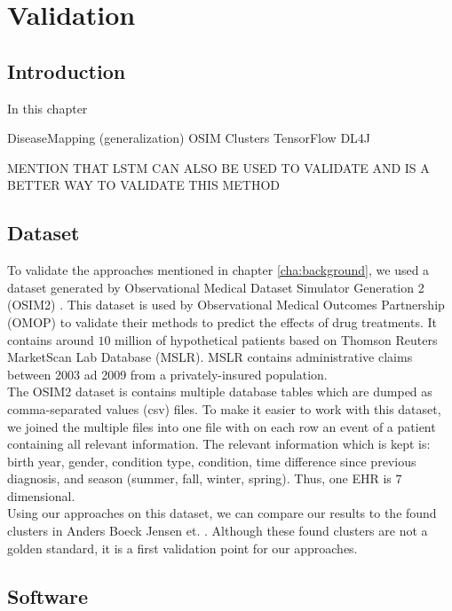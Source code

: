 \graphicspath{ {Implementation/Images/} }


\chapter{Validation}
\label{cha:implementation}

\section{Introduction}
In this chapter 

DiseaseMapping (generalization)
OSIM
Clusters
TensorFlow
DL4J

MENTION THAT LSTM CAN ALSO BE USED TO VALIDATE AND IS A BETTER WAY TO VALIDATE THIS METHOD


\section{Dataset}

To validate the approaches mentioned in chapter \ref{cha:background}, we used a dataset generated by Observational Medical Dataset Simulator Generation 2 (OSIM2) \cite{OSIM:online}. This dataset is used by Observational Medical Outcomes Partnership (OMOP) to validate their methods to predict the effects of drug treatments. It contains around $10$ million of hypothetical patients based on Thomson Reuters MarketScan Lab Database (MSLR). MSLR contains administrative claims between 2003 ad 2009 from a privately-insured population. \\

The OSIM2 dataset is contains multiple database tables which are dumped as comma-separated values (csv) files. To make it easier to work with this dataset, we joined the multiple files into one file with on each row an event of a patient containing all relevant information. The relevant information which is kept is: birth year, gender, condition type, condition, time difference since previous diagnosis, and season (summer, fall, winter, spring). Thus, one EHR is $7$ dimensional. \\	

Using our approaches on this dataset, we can compare our results to the found clusters in Anders Boeck Jensen et. \cite{Brunak:article}. Although these found clusters are not a golden standard, it is a first validation point for our approaches.


\section{Software}

